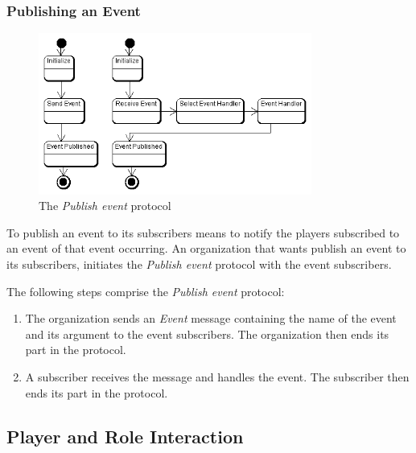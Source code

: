 \subsubsection{Publishing an Event}

\begin{figure}[ht]
	\centering
	\includegraphics[width=0.8\textwidth]{images/thespian/publish-event-protocol.png}
	\caption{The \textit{Publish event} protocol}
	\label{figure:thespian-publish-event-protocol}
\end{figure}

To publish an event to its subscribers means to notify the players subscribed to an event of that event occurring.
An organization that wants publish an event to its subscribers, initiates the \textit{Publish event} protocol with the event subscribers.

The following steps comprise the \textit{Publish event} protocol:
\begin{enumerate}
	\item The organization sends an \textit{Event} message containing the name of the event and its argument to the event subscribers.
	The organization then ends its part in the protocol.
	\item A subscriber receives the message and handles the event.
	The subscriber then ends its part in the protocol.
\end{enumerate}

\subsection{Player and Role Interaction}

